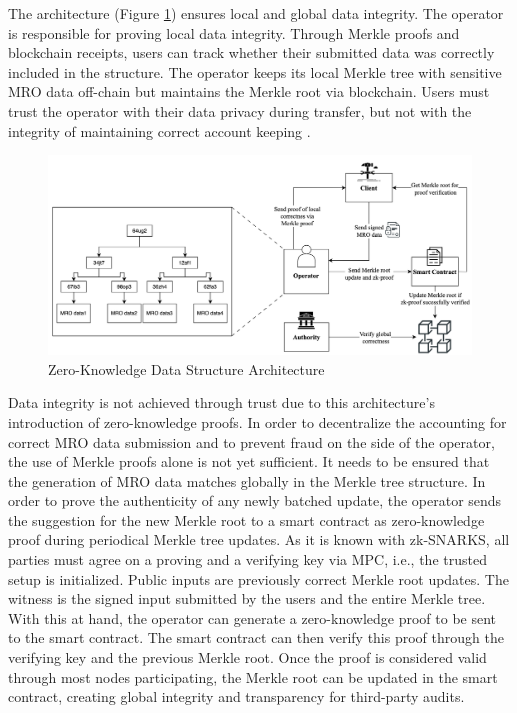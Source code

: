 The architecture (Figure \ref{fig:arch}) ensures local and global data integrity. The operator is responsible for proving local data integrity. Through Merkle proofs and blockchain receipts, users can track whether their submitted data was correctly included in the structure. The operator keeps its local Merkle tree with sensitive MRO data off-chain but maintains the Merkle root via blockchain. Users must trust the operator with their data privacy during transfer, but not with the integrity of maintaining correct account keeping \citep{sedlemeirgrenenergy}. 

\begin{figure}[hbt]
	\centering
		\includegraphics[width=1.0\textwidth]{Pictures/architecture.png}
	\caption{Zero-Knowledge Data Structure Architecture}
	\label{fig:arch}
\end{figure}
Data integrity is not achieved through trust due to this architecture's introduction of zero-knowledge proofs. In order to decentralize the accounting for correct MRO data submission and to prevent fraud on the side of the operator, the use of Merkle proofs alone is not yet sufficient. It needs to be ensured that the generation of MRO data matches globally in the Merkle tree structure. In order to prove the authenticity of any newly batched update, the operator sends the suggestion for the new Merkle root to a smart contract as zero-knowledge proof during periodical Merkle tree updates. As it is known with zk-SNARKS, all parties must agree on a proving and a verifying key via MPC, i.e., the trusted setup is initialized. Public inputs are previously correct Merkle root updates. The witness is the signed input submitted by the users and the entire Merkle tree. With this at hand, the operator can generate a zero-knowledge proof to be sent to the smart contract. The smart contract can then verify this proof through the verifying key and the previous Merkle root. Once the proof is considered valid through most nodes participating, the Merkle root can be updated in the smart contract, creating global integrity and transparency for third-party audits. 

